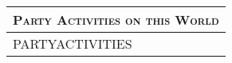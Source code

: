 \documentclass[12pt,letterpaper,twocolumn]{article}
\begin{document}
\begin{tabularx}{\linewidth}{| X |}
    \multicolumn{1}{l}{\textsc{Party Activities on this World}} \\
    \hline
    PARTYACTIVITIES \newline \newline \newline \newline \newline \newline \newline \newline \newline  \newline \newline \newline \newline \newline \newline\\
    \hline
\end{tabularx}
\end{document}

